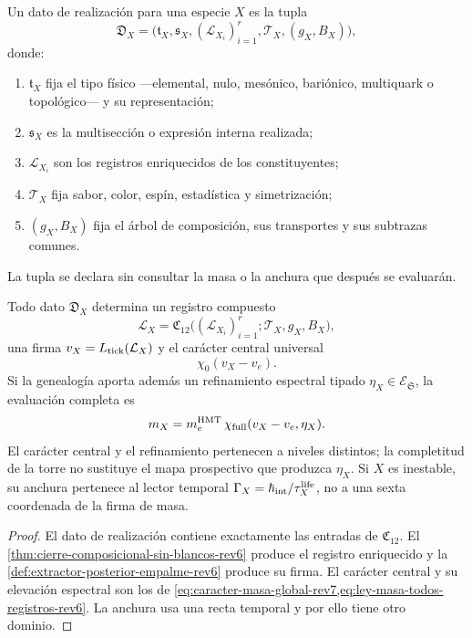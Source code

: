 \begin{definition}
\label{def:dato-realizacion-fisica-rev6}
Un dato de realización para una especie \(X\) es la tupla
\[
 \mathfrak D_X=
 \bigl(
 \mathfrak t_X,\mathfrak s_X,
 (\mathcal L_{X_i})_{i=1}^{r},
 \mathcal T_X,(g_X,B_X)
 \bigr),
\]
donde:
\begin{enumerate}
 \item \(\mathfrak t_X\) fija el tipo físico ---elemental, nulo, mesónico,
 bariónico, multiquark o topológico--- y su representación;
 \item \(\mathfrak s_X\) es la multisección o expresión interna realizada;
 \item \(\mathcal L_{X_i}\) son los registros enriquecidos de los
 constituyentes;
 \item \(\mathcal T_X\) fija sabor, color, espín, estadística y
 simetrización;
 \item \((g_X,B_X)\) fija el árbol de composición, sus transportes y sus
 subtrazas comunes.
\end{enumerate}
La tupla se declara sin consultar la masa o la anchura que después se
evaluarán.
\end{definition}

\begin{proposition}
\label{prop:realizacion-compuesta-ley-unica-rev6}
Todo dato \(\mathfrak D_X\) determina un registro compuesto
\[
 \mathcal L_X
 =\mathfrak C_{12}
   \bigl((\mathcal L_{X_i})_{i=1}^{r};
         \mathcal T_X,g_X,B_X\bigr),
\]
una firma \(v_X=L_{\rm tick}(\mathcal L_X)\) y el carácter central universal
\[
 \chi_0(v_X-v_e).
\]
Si la genealogía aporta además un refinamiento espectral tipado
\(\eta_X\in\mathcal E_{\mathfrak S}\), la evaluación completa es
\[
 m_X
 =m_e^{\rm HMT}\,
   \chi_{\rm full}(v_X-v_e,\eta_X).
\]
El carácter central y el refinamiento pertenecen a niveles distintos; la
completitud de la torre no sustituye el mapa prospectivo que produzca
\(\eta_X\).
Si \(X\) es inestable, su anchura pertenece al lector temporal
\(\Gamma_X=\hbar_{\rm int}/\tau_X^{\rm life}\), no a una sexta coordenada de
la firma de masa.
\end{proposition}

\begin{proof}
El dato de realización contiene exactamente las entradas de
\(\mathfrak C_{12}\). El
\cref{thm:cierre-composicional-sin-blancos-rev6} produce el registro
enriquecido y la \cref{def:extractor-posterior-empalme-rev6} produce su
firma. El carácter central y su elevación espectral son los de
\cref{eq:caracter-masa-global-rev7,eq:ley-masa-todos-registros-rev6}. La
anchura usa una recta temporal y por ello tiene otro dominio.
\end{proof}

